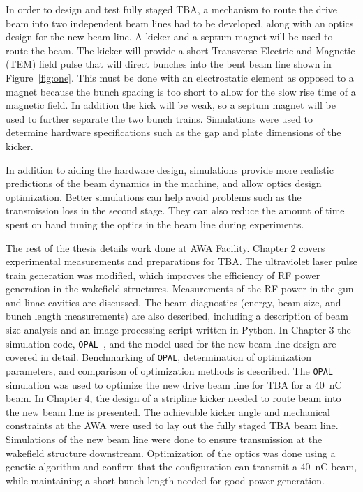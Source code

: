  \label{sec:requirements}

In order to design and test fully staged TBA, a mechanism to route the drive beam into two independent beam lines had to be developed, along with an optics design for the new beam line. A kicker and a septum magnet will be used to route the beam. 
The kicker will provide a short Transverse Electric and Magnetic (TEM) field pulse
that will direct bunches into the bent beam line shown in Figure~\ref{fig:one}. 
This must be done with an electrostatic element as opposed to a magnet because 
the bunch spacing is too short to allow for the slow rise time of a magnetic field.
In addition the kick will be weak, so a septum magnet will be used to further
separate the two bunch trains. Simulations were used to determine hardware specifications such as the gap and plate dimensions of the kicker.

In addition to aiding the hardware design, simulations provide more realistic predictions of the beam dynamics in the machine, and allow optics design optimization.
Better simulations can help avoid problems such as the transmission loss in the second stage.
They can also reduce the amount of time spent on hand tuning the optics in the 
beam line during experiments.






The rest of the thesis details work done at AWA Facility.
Chapter 2 covers experimental measurements and preparations for TBA.
The ultraviolet laser pulse train generation was modified, 
which improves the efficiency of RF power generation in the wakefield structures.
Measurements of the RF power in the gun and linac cavities are discussed.  
The beam diagnostics (energy, beam size, and bunch length measurements) are also described, including a description of beam size analysis and an image processing script written in Python. 
In Chapter 3 the simulation code, \verb|OPAL|~\cite{opal}, and the model used for the new beam line design are covered in detail.
Benchmarking of \verb|OPAL|, determination of optimization parameters, and comparison of optimization methods is described.  The \verb|OPAL| simulation was used to optimize the new drive beam line for TBA for a \SI{40}{nC} beam. 
In Chapter 4, the design of a stripline kicker needed to route beam into the new beam line is presented.
The achievable kicker angle and mechanical constraints at the AWA 
were used to lay out the fully staged TBA beam line. 
Simulations of the new beam line were done to ensure transmission at
the wakefield structure downstream. Optimization of the optics was done using 
a genetic algorithm and confirm that the configuration can transmit a \SI{40}{nC} beam, while maintaining a short bunch length needed for good power generation.



